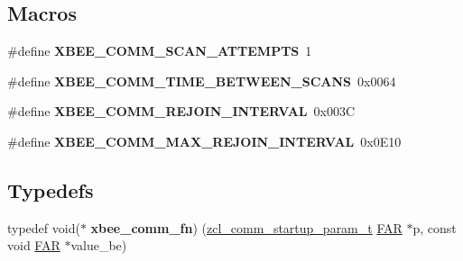 \subsection*{Macros}
\begin{DoxyCompactItemize}
\item 
\mbox{\label{group__xbee__commissioning_ga23d98ae5f8500da3bfa56812d5fcf568}} 
\#define {\bfseries X\+B\+E\+E\+\_\+\+C\+O\+M\+M\+\_\+\+S\+C\+A\+N\+\_\+\+A\+T\+T\+E\+M\+P\+TS}~1
\item 
\mbox{\label{group__xbee__commissioning_gaf8d4e57bf93de8024ae827ddd8a5e9d2}} 
\#define {\bfseries X\+B\+E\+E\+\_\+\+C\+O\+M\+M\+\_\+\+T\+I\+M\+E\+\_\+\+B\+E\+T\+W\+E\+E\+N\+\_\+\+S\+C\+A\+NS}~0x0064
\item 
\mbox{\label{group__xbee__commissioning_gafe13908815f7385ccfb912c0b5aca770}} 
\#define {\bfseries X\+B\+E\+E\+\_\+\+C\+O\+M\+M\+\_\+\+R\+E\+J\+O\+I\+N\+\_\+\+I\+N\+T\+E\+R\+V\+AL}~0x003C
\item 
\mbox{\label{group__xbee__commissioning_gabae5f132ed1e863cd313c12b4c5ce3a3}} 
\#define {\bfseries X\+B\+E\+E\+\_\+\+C\+O\+M\+M\+\_\+\+M\+A\+X\+\_\+\+R\+E\+J\+O\+I\+N\+\_\+\+I\+N\+T\+E\+R\+V\+AL}~0x0\+E10
\end{DoxyCompactItemize}
\subsection*{Typedefs}
\begin{DoxyCompactItemize}
\item 
\mbox{\label{group__xbee__commissioning_gaa98ef492d346b9dc608d7866597ec9a8}} 
typedef void($\ast$ {\bfseries xbee\+\_\+comm\+\_\+fn}) (\hyperlink{structzcl__comm__startup__param__t}{zcl\+\_\+comm\+\_\+startup\+\_\+param\+\_\+t} \hyperlink{group__hal_gaef060b3456fdcc093a7210a762d5f2ed}{F\+AR} $\ast$p, const void \hyperlink{group__hal_gaef060b3456fdcc093a7210a762d5f2ed}{F\+AR} $\ast$value\+\_\+be)
\end{DoxyCompactItemize}
